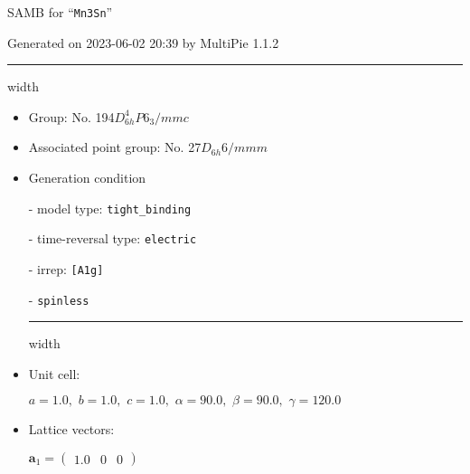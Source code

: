 \documentclass[fleqn,10pt,landscape]{article}
\begin{document}
\setcounter{MaxMatrixCols}{16}

\setlength{\baselineskip}{16pt}
\footnotesize
\begin{center}
\LARGE
SAMB for ``\texttt{Mn3Sn}''
\end{center}
\begin{flushright}
Generated on 2023-06-02 20:39 by MultiPie 1.1.2
\end{flushright}
\vspace{1cm}


 \hfil \hrule height 1mm width \textwidth \hfil

\begin{itemize}
\item Group: No. 194\quad$D_{6h}^{4}$\quad$P6_3/mmc$\quad[ hexagonal ]

\item Associated point group: No. 27\quad$D_{6h}$\quad$6/mmm$\quad[ hexagonal ]

\vspace{5mm}

\item Generation condition

\quad - model type: \texttt{tight_binding}

\quad - time-reversal type: \texttt{electric}

\quad - irrep: \texttt{[A1g]}

\quad - \texttt{spinless}


 \hfil \hrule height 1mm width \textwidth \hfil

\item Unit cell:

\quad $a=1.0,\,\, b=1.0,\,\, c=1.0,\,\, \alpha=90.0,\,\, \beta=90.0,\,\, \gamma=120.0$

\item Lattice vectors:

\quad $\bm{a}_1=\begin{pmatrix} 1.0 & 0 & 0 \end{pmatrix}$


\end{itemize}
\end{document}
